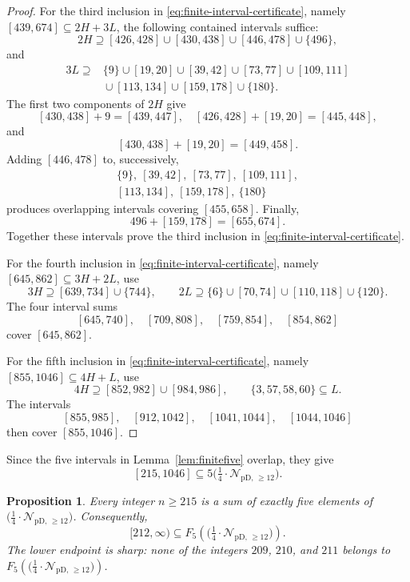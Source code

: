 \documentclass[12pt]{article}
\theoremstyle{plain}
\newtheorem{proposition}[theorem]{Proposition}
\newcommand{\Pset}{\bigl(\tfrac14\cdot
  \mathcal{N}_{\mathrm{pD},\,\geq12}\bigr)}
\begin{document}
\begin{proof}
For the third inclusion in
\eqref{eq:finite-interval-certificate}, namely
$[439,674]\subseteq2H+3L$, the following contained intervals suffice:
\[
 2H\supseteq[426,428]\cup[430,438]\cup[446,478]\cup\{496\},
\]
and
\[
\begin{split}
3L\supseteq{}&\{9\}\cup[19,20]\cup[39,42]\cup[73,77]
 \cup[109,111]\\
 &{}\cup[113,134]\cup[159,178]\cup\{180\}.
\end{split}
\]
The first two components of $2H$ give
\[
 [430,438]+9=[439,447],\quad
 [426,428]+[19,20]=[445,448],
\]
and
\[
 [430,438]+[19,20]=[449,458].
\]
Adding $[446,478]$ to, successively,
\[
\begin{gathered}
 \{9\},\ [39,42],\ [73,77],\ [109,111],\\
 [113,134],\ [159,178],\ \{180\}
\end{gathered}
\]
produces overlapping intervals covering $[455,658]$.  Finally,
\[
 496+[159,178]=[655,674].
\]
Together these intervals prove the third inclusion in
\eqref{eq:finite-interval-certificate}.

For the fourth inclusion in
\eqref{eq:finite-interval-certificate}, namely
$[645,862]\subseteq3H+2L$, use
\[
 3H\supseteq[639,734]\cup\{744\},\qquad
 2L\supseteq\{6\}\cup[70,74]\cup[110,118]\cup\{120\}.
\]
The four interval sums
\[
 [645,740],\quad[709,808],\quad[759,854],\quad[854,862]
\]
cover $[645,862]$.

For the fifth inclusion in
\eqref{eq:finite-interval-certificate}, namely
$[855,1046]\subseteq4H+L$, use
\[
 4H\supseteq[852,982]\cup[984,986],
 \qquad \{3,57,58,60\}\subseteq L.
\]
The intervals
\[
 [855,985],\quad[912,1042],\quad[1041,1044],\quad[1044,1046]
\]
then cover $[855,1046]$.
\end{proof}

Since the five intervals in Lemma~\ref{lem:finitefive} overlap, they give
\[
 [215,1046]\subseteq5\Pset.
\]

\begin{proposition}\label{prop:fiveP}
Every integer $n\geq215$ is a sum of exactly five elements of $\Pset$.
Consequently,
\[
 [212,\infty)\subseteq F_5(\Pset).
\]
The lower endpoint is sharp: none of the integers $209$, $210$, and
$211$ belongs to $F_5(\Pset)$.
\end{proposition}
\end{document}
